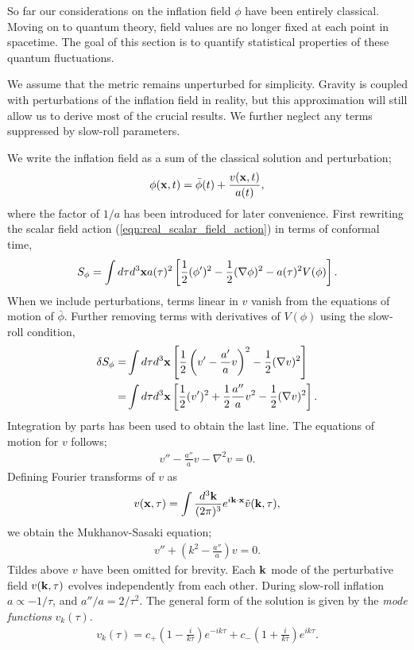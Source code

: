So far our considerations on the inflation field $\phi$ have been entirely classical. Moving on to quantum theory, field values are no longer fixed at each point in spacetime. The goal of this section is to quantify statistical properties of these quantum fluctuations.

We assume that the metric remains unperturbed for simplicity. Gravity is coupled with perturbations of the inflation field in reality, but this approximation will still allow us to derive most of the crucial results. We further neglect any terms suppressed by slow-roll parameters.

We write the inflation field as a sum of the classical solution and perturbation;
\begin{align}
	\phi(\mathbf{x}, t) = \bar{\phi}(t) + \frac{v(\mathbf{x}, t)}{a(t)},	\label{eqn:inflation_perturbation_definition}
\end{align}
where the factor of $1/a$ has been introduced for later convenience. First rewriting the scalar field action (\ref{eqn:real_scalar_field_action}) in terms of conformal time,
\begin{align}
	S_\phi = \int d\tau d^3\mathbf{x} a(\tau)^2 \left[ \frac{1}{2} (\phi')^2 - \frac{1}{2}(\nabla\phi)^2 - a(\tau)^2 V(\phi) \right].
\end{align}
When we include perturbations, terms linear in $v$ vanish from the equations of motion of $\bar\phi$. Further removing terms with derivatives of $V(\phi)$ using the slow-roll condition,
\begin{align}
	\delta S_\phi =& \int d\tau d^3\mathbf{x} \left[ \frac{1}{2} \left(v' - \frac{a'}{a}v \right)^2 - \frac{1}{2}(\nabla v)^2 \right]	\\
	=& \int d\tau d^3\mathbf{x} \left[ \frac{1}{2} (v')^2 + \frac{1}{2}\frac{a''}{a} v^2 - \frac{1}{2}(\nabla v)^2 \right].
\end{align}
Integration by parts has been used to obtain the last line. The equations of motion for $v$ follows;
\begin{align}
	v'' - \frac{a''}{a} v - \nabla^2 v = 0.
\end{align}
Defining Fourier transforms of $v$ as
\begin{align}
	v(\mathbf{x},\tau) = \int \frac{d^3 \mathbf{k}}{(2\pi)^3} e^{i\mathbf{k} \cdot \mathbf{x}} \tilde{v}(\mathbf{k},\tau),
\end{align}
we obtain the Mukhanov-Sasaki equation;
\begin{align}
	v'' + (k^2 - \frac{a''}{a})v = 0.	\label{eqn:Mukhanov_Sasaki}
\end{align}
Tildes above $v$ have been omitted for brevity. Each $\mathbf{k}$ mode of the perturbative field $v(\mathbf{k},\tau)$ evolves independently from each other. During slow-roll inflation $a\propto-1/\tau$, and $a''/a = 2/\tau^2$. The general form of the solution is given by the \textit{mode functions} $v_k(\tau)$.
\begin{align}
	v_k(\tau) = c_+ \left( 1 - \frac{i}{k\tau} \right) e^{-ik\tau} + c_- \left( 1 + \frac{i}{k\tau} \right) e^{ik\tau}.
\end{align}


